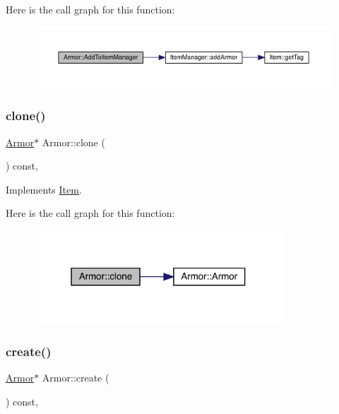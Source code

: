 Here is the call graph for this function\+:
\nopagebreak
\begin{figure}[H]
\begin{center}
\leavevmode
\includegraphics[width=350pt]{d9/d76/class_armor_a008a9def7f07c141c87771937d856616_cgraph}
\end{center}
\end{figure}
\mbox{\label{class_armor_aac8aec108de9a8a45bada1534c0f23b7}} 
\subsubsection{\texorpdfstring{clone()}{clone()}}
{\footnotesize\ttfamily \mbox{\hyperlink{class_armor}{Armor}}$\ast$ Armor\+::clone (\begin{DoxyParamCaption}{ }\end{DoxyParamCaption}) const\hspace{0.3cm}{\ttfamily [inline]}, {\ttfamily [virtual]}}



Implements \mbox{\hyperlink{class_item_a6d963581e2caad2e08979683a827f39f}{Item}}.

Here is the call graph for this function\+:
\nopagebreak
\begin{figure}[H]
\begin{center}
\leavevmode
\includegraphics[width=265pt]{d9/d76/class_armor_aac8aec108de9a8a45bada1534c0f23b7_cgraph}
\end{center}
\end{figure}
\mbox{\label{class_armor_a21de0acaa6ecdb6f5937166b83da9b01}} 
\subsubsection{\texorpdfstring{create()}{create()}}
{\footnotesize\ttfamily \mbox{\hyperlink{class_armor}{Armor}}$\ast$ Armor\+::create (\begin{DoxyParamCaption}{ }\end{DoxyParamCaption}) const\hspace{0.3cm}{\ttfamily [inline]}, {\ttfamily [virtual]}}



